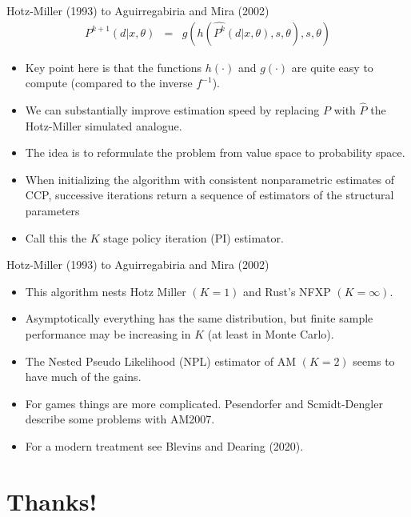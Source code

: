 \documentclass[aspectratio=169,11pt]{beamer}
\begin{document}
\begin{frame}{Hotz-Miller (1993) to Aguirregabiria and Mira (2002)}
\begin{eqnarray*}
P^{k+1}(d | x,\theta) &=& g(h(\hat{P^{k}}(d | x, \theta),s ,\theta),s,\theta)
\end{eqnarray*}
\vspace{-0.5cm}
\begin{itemize}
\item Key point here is that the functions $h(\cdot)$ and $g(\cdot)$ are quite easy to compute (compared to the inverse $f^{-1}$).
\item We can substantially improve estimation speed by replacing $P$ with $\hat{P}$ the Hotz-Miller simulated analogue.
\item The idea is to reformulate the problem from \alert{value space} to \alert{probability space}.
\item When initializing the algorithm with consistent nonparametric estimates of CCP, successive iterations return a sequence of estimators of the structural parameters
\item Call this the $K$ stage policy iteration (PI) estimator.
\end{itemize}
\end{frame}

\begin{frame}{Hotz-Miller (1993) to Aguirregabiria and Mira (2002)}
\begin{itemize}
\item This algorithm nests Hotz Miller $(K=1)$ and Rust's NFXP $(K=\infty)$.
\item Asymptotically everything has the same distribution, but finite sample performance may be increasing in $K$ (at least in Monte Carlo).
\item The Nested Pseudo Likelihood (NPL) estimator of AM $(K=2)$ seems to have much of the gains.
\item For games things are more complicated. Pesendorfer and Scmidt-Dengler describe some problems with AM2007.
\item For a modern treatment see Blevins and Dearing (2020).
\end{itemize}
\end{frame}


\section{Thanks!}
\end{document}
